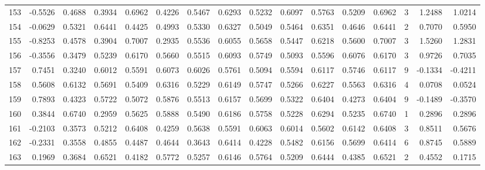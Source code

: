 \begin{tabular}{lrrrrrrrrrrrrrrr}
153 &     -0.5526 &  0.4688 &  0.3934 &  0.6962 &  0.4226 &  0.5467 &  0.6293 &  0.5232 &  0.6097 &  0.5763 &   0.5209 &     0.6962 &      3 &                    1.2488 &                     1.0214 \\
154 &     -0.0629 &  0.5321 &  0.6441 &  0.4425 &  0.4993 &  0.5330 &  0.6327 &  0.5049 &  0.5464 &  0.6351 &   0.4646 &     0.6441 &      2 &                    0.7070 &                     0.5950 \\
155 &     -0.8253 &  0.4578 &  0.3904 &  0.7007 &  0.2935 &  0.5536 &  0.6055 &  0.5658 &  0.5447 &  0.6218 &   0.5600 &     0.7007 &      3 &                    1.5260 &                     1.2831 \\
156 &     -0.3556 &  0.3479 &  0.5239 &  0.6170 &  0.5660 &  0.5515 &  0.6093 &  0.5749 &  0.5093 &  0.5596 &   0.6076 &     0.6170 &      3 &                    0.9726 &                     0.7035 \\
157 &      0.7451 &  0.3240 &  0.6012 &  0.5591 &  0.6073 &  0.6026 &  0.5761 &  0.5094 &  0.5594 &  0.6117 &   0.5746 &     0.6117 &      9 &                   -0.1334 &                    -0.4211 \\
158 &      0.5608 &  0.6132 &  0.5691 &  0.5409 &  0.6316 &  0.5229 &  0.6149 &  0.5747 &  0.5266 &  0.6227 &   0.5563 &     0.6316 &      4 &                    0.0708 &                     0.0524 \\
159 &      0.7893 &  0.4323 &  0.5722 &  0.5072 &  0.5876 &  0.5513 &  0.6157 &  0.5699 &  0.5322 &  0.6404 &   0.4273 &     0.6404 &      9 &                   -0.1489 &                    -0.3570 \\
160 &      0.3844 &  0.6740 &  0.2959 &  0.5625 &  0.5888 &  0.5490 &  0.6186 &  0.5758 &  0.5228 &  0.6294 &   0.5235 &     0.6740 &      1 &                    0.2896 &                     0.2896 \\
161 &     -0.2103 &  0.3573 &  0.5212 &  0.6408 &  0.4259 &  0.5638 &  0.5591 &  0.6063 &  0.6014 &  0.5602 &   0.6142 &     0.6408 &      3 &                    0.8511 &                     0.5676 \\
162 &     -0.2331 &  0.3558 &  0.4855 &  0.4487 &  0.4644 &  0.3643 &  0.6414 &  0.4228 &  0.5482 &  0.6156 &   0.5699 &     0.6414 &      6 &                    0.8745 &                     0.5889 \\
163 &      0.1969 &  0.3684 &  0.6521 &  0.4182 &  0.5772 &  0.5257 &  0.6146 &  0.5764 &  0.5209 &  0.6444 &   0.4385 &     0.6521 &      2 &                    0.4552 &                     0.1715 \\

\end{tabular}
